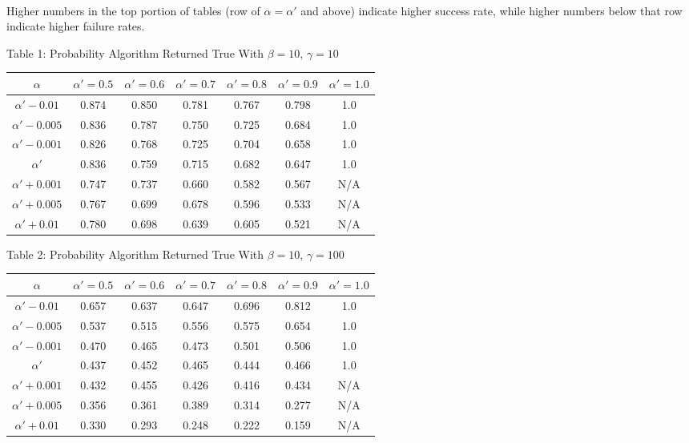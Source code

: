 \documentclass{article}
\begin{document}
\paragraph{}Higher numbers in the top portion of tables (row of $\alpha = \alpha'$ and above) indicate higher success rate, while higher numbers below that row indicate higher failure rates.
\begin{center}
Table 1: Probability Algorithm Returned True With $\beta=10$, $\gamma=10$ \\
\begin{tabular}{|c|c|c|c|c|c|c|}
\hline
$\alpha$ & $\alpha' = 0.5$ & $\alpha' = 0.6$ & $\alpha' = 0.7$ & $\alpha' = 0.8$ & $\alpha' = 0.9$ & $\alpha' = 1.0$ \\
\hline
$\alpha' -0.01$ & 0.874 & 0.850 & 0.781 & 0.767 & 0.798 & 1.0 \\
\hline
$\alpha'-0.005$ & 0.836 & 0.787 & 0.750 & 0.725 & 0.684 & 1.0 \\
\hline
$\alpha'-0.001$ & 0.826 & 0.768 & 0.725 & 0.704 & 0.658 & 1.0 \\
\hline
$\alpha'$            & 0.836 & 0.759 & 0.715 & 0.682 & 0.647 & 1.0 \\
\hline
$\alpha'+0.001$ & 0.747 & 0.737 & 0.660 & 0.582 & 0.567 & N/A \\
\hline
$\alpha'+0.005$ & 0.767 & 0.699 & 0.678 & 0.596 & 0.533 & N/A \\
\hline
$\alpha'+0.01 $ & 0.780 & 0.698 & 0.639 & 0.605 & 0.521 & N/A \\
\hline
\end{tabular}
\end{center}

\begin{center}
Table 2: Probability Algorithm Returned True With $\beta=10$, $\gamma=100$ \\
\begin{tabular}{|c|c|c|c|c|c|c|}
\hline
$\alpha$ & $\alpha' = 0.5$ & $\alpha' = 0.6$ & $\alpha' = 0.7$ & $\alpha' = 0.8$ & $\alpha' = 0.9$ & $\alpha' = 1.0$ \\
\hline
$\alpha' -0.01$ & 0.657 & 0.637 & 0.647 & 0.696 & 0.812 & 1.0 \\
\hline
$\alpha'-0.005$ & 0.537 & 0.515 & 0.556 & 0.575 & 0.654 & 1.0 \\
\hline
$\alpha'-0.001$ & 0.470 & 0.465 & 0.473 & 0.501 & 0.506 & 1.0 \\
\hline
$\alpha'$         & 0.437 & 0.452 & 0.465 & 0.444 & 0.466 & 1.0 \\
\hline
$\alpha'+0.001$ & 0.432 & 0.455 & 0.426 & 0.416 & 0.434 & N/A \\
\hline
$\alpha'+0.005$ & 0.356 & 0.361 & 0.389 & 0.314 & 0.277 & N/A \\
\hline
$\alpha'+0.01 $ & 0.330 & 0.293 & 0.248 & 0.222 & 0.159 & N/A \\
\hline
\end{tabular}
\end{center}
\end{document}

